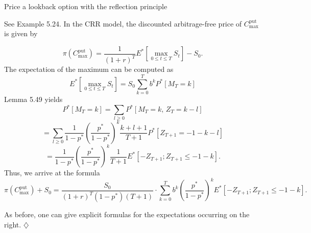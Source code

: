 Price a lookback option with the reflection principle

See Example 5.24. 
In the CRR model, the discounted arbitrage-free price of \( C^{\text{put}}_{\max} \) is given by

\[
\pi \left( C^{\text{put}}_{\max} \right) = \frac{1}{(1+r)^T} E^* \left[ \max_{0 \leq t \leq T} S_t \right] - S_0.
\]
The expectation of the maximum can be computed as
\[
E^* \left[ \max_{0 \leq t \leq T} S_t \right] = S_0 \sum_{k=0}^{T} b^k P^*[M_T = k]
\]
Lemma 5.49 yields
\[
P^*[M_T = k] = \sum_{l \geq 0} P^*[M_T = k, \, Z_T = k-l]
\]
\[
= \sum_{l \geq 0} \frac{1}{1-p^*} \left( \frac{p^*}{1-p^*} \right)^k \frac{k+l+1}{T+1} P^*[Z_{T+1} = -1-k-l]
\]
\[
= \frac{1}{1-p^*} \left( \frac{p^*}{1-p^*} \right)^k \frac{1}{T+1} E^*[-Z_{T+1}; Z_{T+1} \leq -1-k].
\]
Thus, we arrive at the formula
\[
\pi \left( C^{\text{put}}_{\max} \right) + S_0 = \frac{S_0}{(1+r)^T (1-p^*)(T+1)} \cdot \sum_{k=0}^{T} b^k \left( \frac{p^*}{1-p^*} \right)^k E^*[-Z_{T+1}; Z_{T+1} \leq -1-k].
\]

As before, one can give explicit formulas for the expectations occurring on the right. \(\diamondsuit\)
